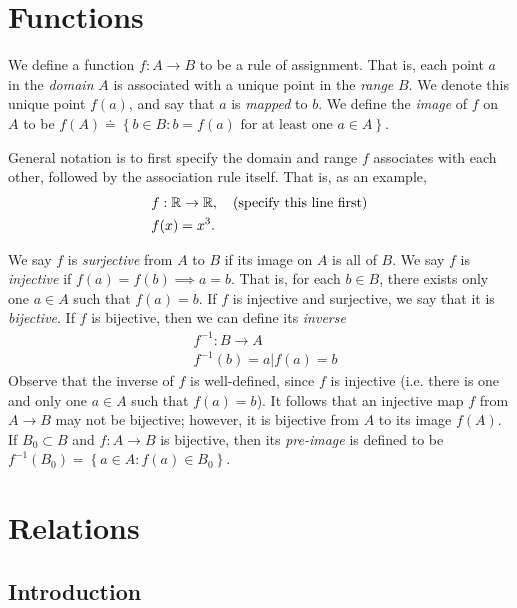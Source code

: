 \section{Functions}
We define a function $f: A \to B$ to be a rule of assignment. That is,
each point $a$ in the \emph{domain} $A$ is associated with a unique point in
the \emph{range} $B$. We denote this unique point $f(a)$, and say that
$a$ is \emph{mapped} to $b$. We define the \emph{image} of $f$ on $A$ to be
$f(A) \doteq \left\{ b \in B: b = f(a) \text{ for at least one } a \in A
\right\}$.
\begin{example}
	General notation is to first specify the domain and range $f$ associates with each
	other, followed by the association rule itself. That is, as an example,
	\begin{equation*}
	\begin{split}
	& f: \mathbb{R} \to \mathbb{R}, \quad \text{(specify this line first)}\\
	& f(x) = x^{3}.
	\end{split}
	\end{equation*}
\end{example}
We say $f$ is \emph{surjective} from $A$ to $B$ if its image on $A$ is all of
$B$. We say $f$ is \emph{injective} if $f(a) = f(b) \implies a = b$. That is,
for each $b \in B$, there exists only one $a \in A$ such that $f(a) = b$.
If $f$ is injective and surjective, we say that it is \emph{bijective}.
If $f$ is bijective, then we can define its \emph{inverse} 
\begin{equation*}
\begin{split}
	& f^{-1}: B \to A
	\\
	& f^{-1}(b) = a | f(a) = b
\end{split}
\end{equation*}
Observe that the inverse of $f$ is well-defined, since $f$ is injective (i.e.
there is one and only one $a \in A$ such that $f(a) = b$). It follows that
an injective map $f$ from $A \to B$ may not be bijective; however, it is
bijective from $A$ to its image $f(A)$. If $B_{0} \subset B$ and $f: A \to B$ is
bijective, then its
\emph{pre-image} is defined to be $f^{-1}(B_{0}) = \left\{ a \in A: f(a) \in
B_{0} \right\}$.
\section{Relations}
\subsection{Introduction} 

